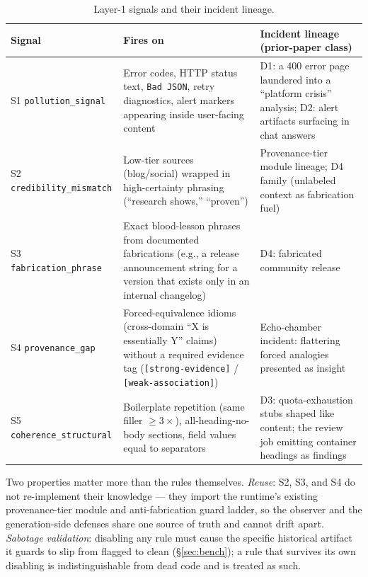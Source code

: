 \documentclass[11pt]{article}
\begin{document}
\begin{table}[h]
\centering\scriptsize
\begin{tabular}{@{}p{3.0cm}p{5.6cm}p{6.6cm}@{}}
\toprule
\textbf{Signal} & \textbf{Fires on} & \textbf{Incident lineage
(prior-paper class)} \\
\midrule
S1 \texttt{pollution\_signal} & Error codes, HTTP status text,
\texttt{Bad JSON}, retry diagnostics, alert markers appearing inside
user-facing content & D1: a 400 error page laundered into a ``platform
crisis'' analysis; D2: alert artifacts surfacing in chat answers \\
\addlinespace
S2 \texttt{credibility\_mismatch} & Low-tier sources (blog/social)
wrapped in high-certainty phrasing (``research shows,'' ``proven'') &
Provenance-tier module lineage; D4 family (unlabeled context as
fabrication fuel) \\
\addlinespace
S3 \texttt{fabrication\_phrase} & Exact blood-lesson phrases from
documented fabrications (e.g., a release announcement string for a
version that exists only in an internal changelog) & D4: fabricated
community release \\
\addlinespace
S4 \texttt{provenance\_gap} & Forced-equivalence idioms (cross-domain
``X is essentially Y'' claims) without a required evidence tag
(\texttt{[strong-evidence]} / \texttt{[weak-association]}) &
Echo-chamber incident: flattering forced analogies presented as insight \\
\addlinespace
S5 \texttt{coherence\_structural} & Boilerplate repetition (same filler
$\geq 3\times$), all-heading-no-body sections, field values equal to
separators & D3: quota-exhaustion stubs shaped like content; the review
job emitting container headings as findings \\
\bottomrule
\end{tabular}
\caption{Layer-1 signals and their incident lineage.}
\label{tab:signals}
\end{table}

Two properties matter more than the rules themselves. \emph{Reuse}: S2,
S3, and S4 do not re-implement their knowledge --- they import the
runtime's existing provenance-tier module and anti-fabrication guard
ladder, so the observer and the generation-side defenses share one
source of truth and cannot drift apart. \emph{Sabotage validation}:
disabling any rule must cause the specific historical artifact it
guards to slip from flagged to clean (\S\ref{sec:bench}); a rule that
survives its own disabling is indistinguishable from dead code and is
treated as such.
\end{document}
